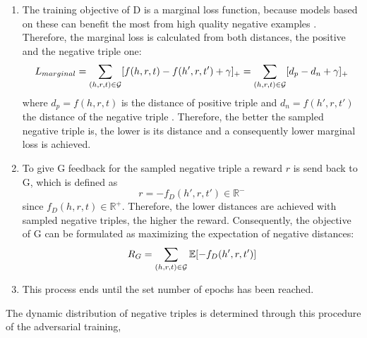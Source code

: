 \begin{enumerate}
    \item 
    The training objective of D is a marginal loss function, because models based on these can  benefit the most from high quality negative examples .
    Therefore, the marginal loss is calculated from both distances, the positive and the negative triple one:
     \begin{equation}
        L_{marginal}
        =\sum_{(h,r,t)\in\mathcal{G}}[f(h,r,t)-f(h',r,t')+\gamma]_+ 
        = \sum_{(h,r,t)\in\mathcal{G}}[d_p-d_n+\gamma]_+ 
    \end{equation}
    where $d_p = f(h,r,t)$ is the distance of positive triple  and $d_n = f(h',r,t')$ the distance of the negative triple  .
    Therefore, the better the sampled negative triple is, the lower is its distance and a consequently lower marginal loss is achieved.
    
    \item 
    To give G feedback for the sampled negative triple  a reward $r$ is send back to G, which is defined as
    \begin{equation}
        r = -f_D(h',r,t') \in \mathbb{R}^-
    \end{equation}
    since $f_D(h,r,t) \in \mathbb{R}^+$.
    Therefore, the lower distances are achieved with sampled negative triples, the higher the reward.
    Consequently, the objective of G can be formulated as maximizing the expectation of negative distances:
    \begin{equation}
        R_G=\sum_{(h,r,t)\in\mathcal{G}}\mathbb{E}[-f_D(h',r,t')]
    \end{equation}
    
    \item
    This process ends until the set number of epochs has been reached.
    
\end{enumerate}
The dynamic distribution of negative triples is determined through this procedure of the adversarial training, 